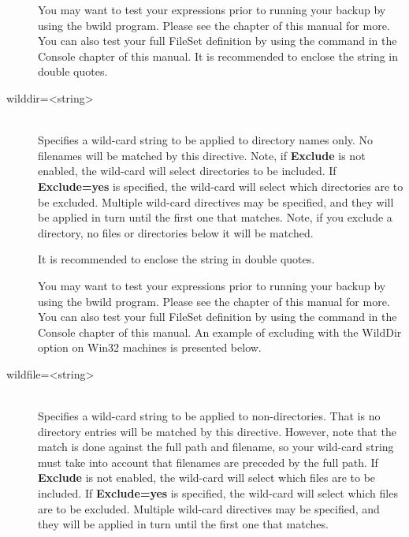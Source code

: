 \begin{description}
   You may want to test your expressions prior to running your
   backup by using the bwild program. Please see the
    chapter of this manual for
   more. You can also test your full FileSet definition by using
   the  command in the Console
   chapter of this manual.
   It is recommended to enclose the string in double quotes.

\item [wilddir={\textless}string{\textgreater}] \hfill \\
   Specifies a wild-card string to be applied to directory names only.  No
   filenames will be matched by this directive.  Note, if {\bf Exclude} is
   not enabled, the wild-card will select directories to be
   included.  If {\bf Exclude=yes} is specified, the wild-card will select
   which directories are to be excluded.  Multiple wild-card directives may be
   specified, and they will be applied in turn until the first one that
   matches.  Note, if you exclude a directory, no files or directories
   below it will be matched.

   It is recommended to enclose the string in double quotes.

   You may want to test your expressions prior to running your
   backup by using the bwild program. Please see the
    chapter of this manual for
   more. You can also test your full FileSet definition by using
   the  command in the Console
   chapter of this manual.
   An example of excluding with the WildDir option on Win32 machines is
   presented below.

\item [wildfile={\textless}string{\textgreater}] \hfill \\
   Specifies a wild-card string to be applied to non-directories. That
   is no directory entries will be matched by this directive.
   However, note that the match is done against the full path and filename,
   so your wild-card string must take into account that filenames
   are preceded by the full path.
   If {\bf Exclude}
   is not enabled, the wild-card will select which files are to be
   included.  If {\bf Exclude=yes} is specified, the wild-card will select
   which files are to be excluded.  Multiple wild-card directives may be
   specified, and they will be applied in turn until the first one that
   matches.


\end{description}
